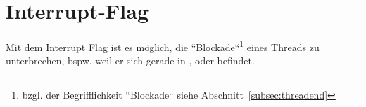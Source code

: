 \section{Interrupt-Flag}

Mit dem Interrupt Flag ist es möglich, die ``Blockade``\footnote{
bzgl. der Begrifflichkeit ``Blockade`` siehe Abschnitt~\ref{subsec:threadend}
} eines Threads zu unterbrechen, bspw. weil er sich gerade in ,  oder  befindet.